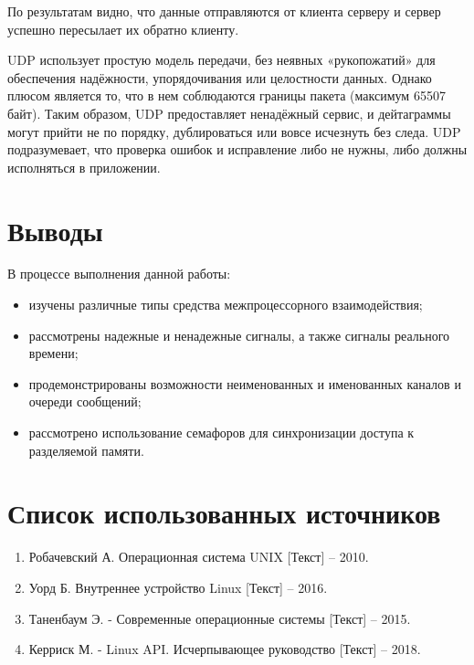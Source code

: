 

По результатам видно, что данные отправляются от клиента серверу и сервер успешно пересылает их обратно клиенту.

UDP использует простую модель передачи, без неявных «рукопожатий» для обеспечения надёжности, упорядочивания или целостности данных. Однако плюсом является то, что в нем соблюдаются границы пакета (максимум 65507 байт). Таким образом, UDP предоставляет ненадёжный сервис, и дейтаграммы могут прийти не по порядку, дублироваться или вовсе исчезнуть без следа. UDP подразумевает, что проверка ошибок и исправление либо не нужны, либо должны исполняться в приложении.

\section{Выводы}

В процессе выполнения данной работы:

\begin{itemize}
	\item изучены различные типы средства межпроцессорного взаимодействия;
	\item рассмотрены надежные и ненадежные сигналы, а также сигналы реального времени;
	\item продемонстрированы возможности неименованных и именованных каналов и очереди сообщений;
	\item рассмотрено использование семафоров для синхронизации доступа к разделяемой памяти.
\end{itemize}

\section*{Список использованных источников}

\begin{enumerate}
	\item Робачевский А. Операционная система UNIX [Текст] -- 2010.
	\item Уорд Б. Внутреннее устройство Linux [Текст] -- 2016.
	\item Таненбаум Э. - Современные операционные системы [Текст] -- 2015.
	\item Керриск М. - Linux API. Исчерпывающее руководство [Текст] -- 2018.
\end{enumerate}	

\newpage

